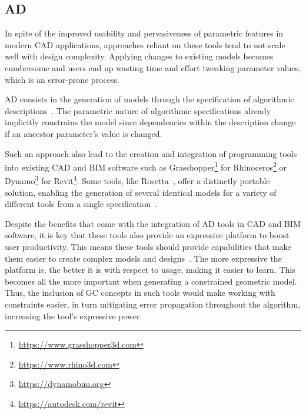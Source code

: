 \subsection{\acl{AD}}%
\label{sec:intro.ad}

In spite of the improved usability and pervasiveness of parametric features in
modern \ac{CAD} applications, approaches reliant on these tools tend to not
scale well with design complexity.  Applying changes to existing models becomes
cumbersome and users end up wasting time and effort tweaking parameter values,
which is an error-prone process.

\Ac{AD} consists in the generation of models through the specification of
algorithmic descriptions~\cite{McCormack:2004:GDPDR}.  The parametric nature of
algorithmic specifications already implicitly constrains the model since
dependencies within the description change if an ancestor parameter's value is
changed.

Such an approach also lead to the creation and integration of programming tools
into existing \ac{CAD} and \ac{BIM} software such as
Grasshopper\footnote{\url{https://www.grasshopper3d.com}} for
Rhinoceros\footnote{\url{https://www.rhino3d.com}} or
Dynamo\footnote{\url{https://dynamobim.org}} for
Revit\footnote{\url{https://autodesk.com/revit}}.  Some tools, like
Rosetta~\cite{Leitao:2011:PGDCAD}, offer a distinctly portable solution,
enabling the generation of several identical models for a variety of different
tools from a single specification~\cite{CasteloBranco:2017:IAD}.

Despite the benefits that come with the integration of \ac{AD} tools in \ac{CAD}
and \ac{BIM} software, it is key that these tools also provide an expressive
platform to boost user productivity.  This means these tools should provide
capabilities that make them easier to create complex models and
designs~\cite{Leitao:2014:IGDAGHOP}.  The more expressive the platform is, the
better it is with respect to usage, making it easier to learn.  This becomes all
the more important when generating a constrained geometric model.  Thus, the
inclusion of \ac{GC} concepts in such tools would make working with constraints
easier, in turn mitigating error propagation throughout the algorithm,
increasing the tool's expressive power.
